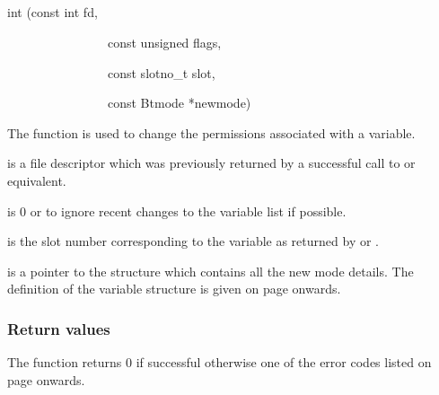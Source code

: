 \subsection{\funcnameXBvarchmod{}}

\begin{expara}

int \funcnameXBvarchmod{}(const int fd,

\ \ \ \ \ \ \ \ \ \ \ \ \ \ \ \ const unsigned flags,

\ \ \ \ \ \ \ \ \ \ \ \ \ \ \ \ const slotno\_t slot,

\ \ \ \ \ \ \ \ \ \ \ \ \ \ \ \ const Btmode *newmode)

\end{expara}

The function \funcXBvarchmod{} is used to change the
permissions associated with a variable.

 is a file descriptor which was previously
returned by a successful call to \funcXBopen{} or equivalent.

 is 0 or
 to ignore recent changes to
the variable list if possible.

 is the slot number corresponding to the
variable as returned by \funcXBvarlist{} or
\funcXBvarfindslot{}.

 is a pointer to the structure which
contains all the new mode details. The definition of the variable
structure is given on page \pageref{bkm:Varstructure} onwards.

\subsubsection{Return values}
The function returns 0 if successful otherwise one of the error codes
listed on page \pageref{errorcodes} onwards.

